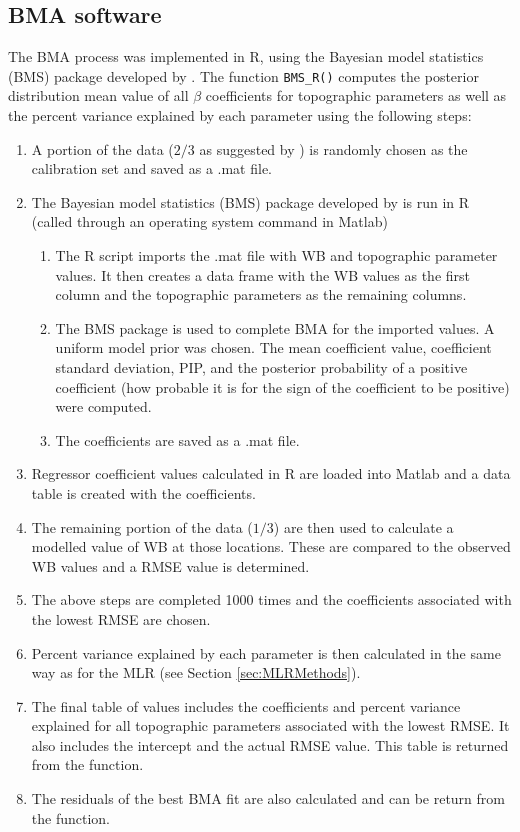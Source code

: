 \documentclass{sfuthesis}
\begin{document}
\begin{appendices}
	\chapter{BMA software}
\label{sec:BMAmethods}
The BMA process was implemented in R, using the Bayesian model statistics (BMS) package developed by \cite{Zeugner2015}. The function \texttt{BMS\_R()} computes the posterior distribution mean value of all $\beta$ coefficients for topographic parameters as well as the percent variance explained by each parameter using the following steps:
\begin{enumerate}
\item A portion of the data ($2/3$ as suggested by \cite{Kohavi1995}) is randomly chosen as the calibration set and saved as a .mat file. 
\item The Bayesian model statistics (BMS) package developed by \cite{Zeugner2015} is run in R (called through an operating system command in Matlab)
	\begin{enumerate}
		\item The R script imports the .mat file with WB and topographic parameter values. It then creates a data frame with the WB values as the first column and the topographic parameters as the remaining 	columns. 
		\item The BMS package is used to complete BMA for the imported values. A uniform model prior was chosen. The mean coefficient value, coefficient standard deviation, PIP, and the posterior probability of a positive coefficient (how probable it is for the sign of the coefficient to be positive) were computed.
		\item The coefficients are saved as a .mat file.
	\end{enumerate}
\item Regressor coefficient values calculated in R are loaded into Matlab and a data table is created with the coefficients.
\item The remaining portion of the data ($1/3$) are then used to calculate a modelled value of WB at those locations. These are compared to the observed WB values and a RMSE value is determined.
\item The above steps are completed 1000 times and the coefficients associated with the lowest RMSE are chosen.
\item Percent variance explained by each parameter is then calculated in the same way as for the MLR (see Section \ref{sec:MLRMethods}). 
\item The final table of values includes the coefficients and percent variance explained for all topographic parameters associated with the lowest RMSE. It also includes the intercept and the actual RMSE value. This table is returned from the function.
\item The residuals of the best BMA fit are also calculated and can be return from the function.  
\end{enumerate}
	



\end{appendices}
\end{document}
